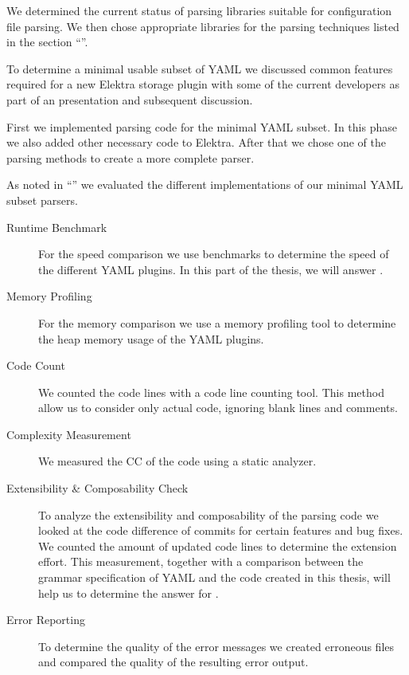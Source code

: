 \begin{description}[style=multiline, leftmargin=3.2cm, font=\bfseries]

  \item[Literature Review] We determined the current status of parsing libraries suitable for configuration file parsing. We then chose appropriate libraries for the parsing techniques listed in the section “”.

  \item[Discussion] To determine a minimal usable subset of YAML we discussed common features required for a new Elektra storage plugin with some of the current developers as part of an presentation and subsequent discussion.

  \item[Implementation] First we implemented parsing code for the minimal YAML subset. In this phase we also added other necessary code to Elektra. After that we chose one of the parsing methods to create a more complete  parser.

  \item[Comparison] As noted in “” we evaluated the different implementations of our minimal YAML subset parsers.

  \begin{description}
    \item[Runtime Benchmark] For the speed comparison we use benchmarks to determine the speed of the different YAML plugins. In this part of the thesis, we will answer .

    \item[Memory Profiling] For the memory comparison we use a memory profiling tool to determine the heap memory usage of the YAML plugins.

    \item[Code Count] We counted the code lines with a code line counting tool. This method allow us to consider only actual code, ignoring blank lines and comments.

    \item[Complexity Measurement] We measured the \gls{CC} of the code using a static analyzer.

    \item[Extensibility \& Composability Check] To analyze the extensibility and composability of the parsing code we looked at the code difference of commits for certain features and bug fixes. We counted the amount of updated code lines to determine the extension effort. This measurement, together with a comparison between the grammar specification of YAML and the code created in this thesis, will help us to determine the answer for .

    \item[Error Reporting] To determine the quality of the error messages we created erroneous files and compared the quality of the resulting error output.
  \end{description}

\end{description}
